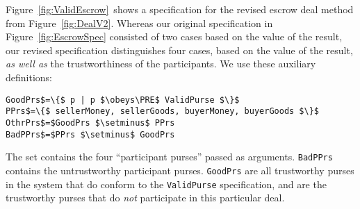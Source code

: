 Figure~\ref{fig:ValidEscrow}~shows a specification for the
revised escrow deal method from Figure~\ref{fig:DealV2}.  Whereas our
original specification in Figure~\ref{fig:EscrowSpec} consisted of two
cases based on the value of the result,
our revised
 specification distinguishes %
four cases, based
on %
the value of the result, {\em as well as} the trustworthiness of the participants.  
%
We use these auxiliary
definitions:
\vspace{-1ex}
\begin{lstlisting}[numbers=none,frame=none,rulecolor=\color{white}]
GoodPrs$=\{$ p | p $\obeys\PRE$ ValidPurse $\}$
PPrs$=\{$ sellerMoney, sellerGoods, buyerMoney, buyerGoods $\}$
OthrPrs$=$GoodPrs $\setminus$ PPrs
BadPPrs$=$PPrs $\setminus$ GoodPrs
\end{lstlisting}
\vspace{-1.5ex}
 The
set  contains the four ``participant purses'' passed
as arguments. %
\lstinline{BadPPrs} contains %
the untrustworthy participant purses.
\lstinline{GoodPrs} are all trustworthy purses in the system
that do conform to the \lstinline{ValidPurse} specification, and
 are the trustworthy purses that do
\textit{not} participate in this particular deal.

